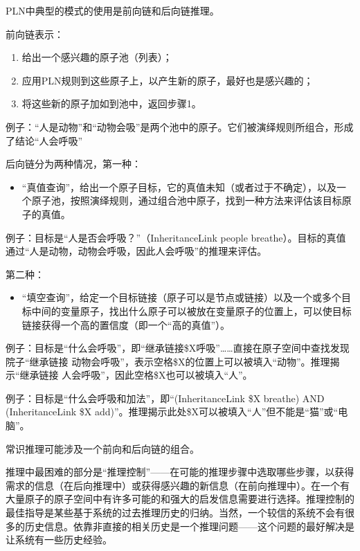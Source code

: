 PLN中典型的模式的使用是前向链和后向链推理。

前向链表示：

\begin{enumerate}
\item 给出一个感兴趣的原子池（列表）；
\item 应用PLN规则到这些原子上，以产生新的原子，最好也是感兴趣的；
\item 将这些新的原子加如到池中，返回步骤1。
\end{enumerate}

例子：“人是动物”和“动物会吸”是两个池中的原子。它们被演绎规则所组合，形成了结论“人会呼吸”

后向链分为两种情况，第一种：

\begin{itemize}
\item “真值查询”，给出一个原子目标，它的真值未知（或者过于不确定），以及一个原子池，按照演绎规则，通过组合池中原子，找到一种方法来评估该目标原子的真值。
\end{itemize}

例子：目标是“人是否会呼吸？”（InheritanceLink people breathe）。目标的真值通过“人是动物，动物会呼吸，因此人会呼吸”的推理来评估。

第二种：

\begin{itemize}
\item “填空查询”，给定一个目标链接（原子可以是节点或链接）以及一个或多个目标中间的变量原子，找出什么原子可以被放在变量原子的位置上，可以使目标链接获得一个高的置信度（即一个“高的真值”）。
\end{itemize}

例子：目标是“什么会呼吸”，即“继承链接\$X呼吸”……直接在原子空间中查找发现院子“继承链接 动物会呼吸”，表示空格\$X的位置上可以被填入“动物”。推理揭示“继承链接 人会呼吸”，因此空格\$X也可以被填入“人”。

例子：目标是“什么会呼吸和加法”，即“(InheritanceLink \$X breathe) AND (InheritanceLink \$X add)”。推理揭示此处\$X可以被填入“人”但不能是“猫”或“电脑”。

常识推理可能涉及一个前向和后向链的组合。

推理中最困难的部分是“推理控制”——在可能的推理步骤中选取哪些步骤，以获得需求的信息（在后向推理中）或获得感兴趣的新信息（在前向推理中）。在一个有大量原子的原子空间中有许多可能的和强大的启发信息需要进行选择。推理控制的最佳指导是某些基于系统的过去推理历史的归纳。当然，一个较信的系统不会有很多的历史信息。依靠非直接的相关历史是一个推理问题——这个问题的最好解决是让系统有一些历史经验。

